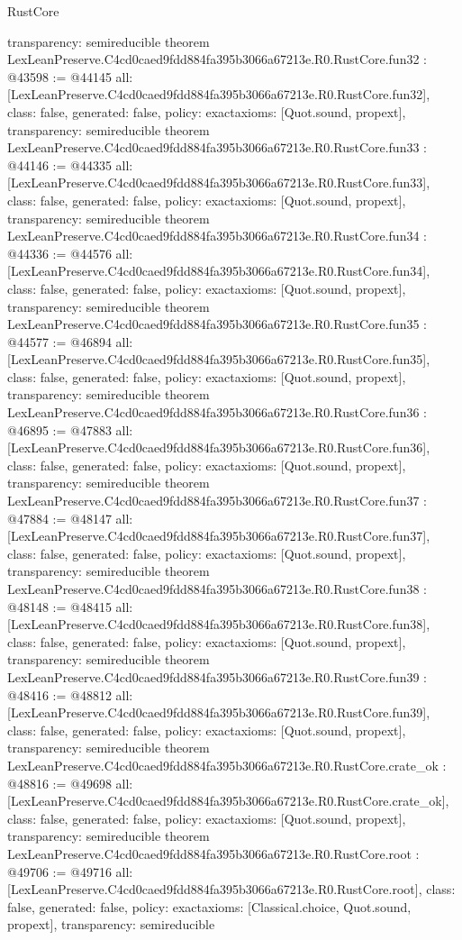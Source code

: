 \begin{lexlean}{RustCore}
\begin{coremodule}
{  transparency: semireducible
}
theorem LexLeanPreserve.C4cd0caed9fdd884fa395b3066a67213e.R0.RustCore.fun32 : @43598 := @44145 {
  all: [LexLeanPreserve.C4cd0caed9fdd884fa395b3066a67213e.R0.RustCore.fun32],
  class: false,
  generated: false,
  policy: exact{axioms: [Quot.sound, propext]},
  transparency: semireducible
}
theorem LexLeanPreserve.C4cd0caed9fdd884fa395b3066a67213e.R0.RustCore.fun33 : @44146 := @44335 {
  all: [LexLeanPreserve.C4cd0caed9fdd884fa395b3066a67213e.R0.RustCore.fun33],
  class: false,
  generated: false,
  policy: exact{axioms: [Quot.sound, propext]},
  transparency: semireducible
}
theorem LexLeanPreserve.C4cd0caed9fdd884fa395b3066a67213e.R0.RustCore.fun34 : @44336 := @44576 {
  all: [LexLeanPreserve.C4cd0caed9fdd884fa395b3066a67213e.R0.RustCore.fun34],
  class: false,
  generated: false,
  policy: exact{axioms: [Quot.sound, propext]},
  transparency: semireducible
}
theorem LexLeanPreserve.C4cd0caed9fdd884fa395b3066a67213e.R0.RustCore.fun35 : @44577 := @46894 {
  all: [LexLeanPreserve.C4cd0caed9fdd884fa395b3066a67213e.R0.RustCore.fun35],
  class: false,
  generated: false,
  policy: exact{axioms: [Quot.sound, propext]},
  transparency: semireducible
}
theorem LexLeanPreserve.C4cd0caed9fdd884fa395b3066a67213e.R0.RustCore.fun36 : @46895 := @47883 {
  all: [LexLeanPreserve.C4cd0caed9fdd884fa395b3066a67213e.R0.RustCore.fun36],
  class: false,
  generated: false,
  policy: exact{axioms: [Quot.sound, propext]},
  transparency: semireducible
}
theorem LexLeanPreserve.C4cd0caed9fdd884fa395b3066a67213e.R0.RustCore.fun37 : @47884 := @48147 {
  all: [LexLeanPreserve.C4cd0caed9fdd884fa395b3066a67213e.R0.RustCore.fun37],
  class: false,
  generated: false,
  policy: exact{axioms: [Quot.sound, propext]},
  transparency: semireducible
}
theorem LexLeanPreserve.C4cd0caed9fdd884fa395b3066a67213e.R0.RustCore.fun38 : @48148 := @48415 {
  all: [LexLeanPreserve.C4cd0caed9fdd884fa395b3066a67213e.R0.RustCore.fun38],
  class: false,
  generated: false,
  policy: exact{axioms: [Quot.sound, propext]},
  transparency: semireducible
}
theorem LexLeanPreserve.C4cd0caed9fdd884fa395b3066a67213e.R0.RustCore.fun39 : @48416 := @48812 {
  all: [LexLeanPreserve.C4cd0caed9fdd884fa395b3066a67213e.R0.RustCore.fun39],
  class: false,
  generated: false,
  policy: exact{axioms: [Quot.sound, propext]},
  transparency: semireducible
}
theorem LexLeanPreserve.C4cd0caed9fdd884fa395b3066a67213e.R0.RustCore.crate_ok : @48816 := @49698 {
  all: [LexLeanPreserve.C4cd0caed9fdd884fa395b3066a67213e.R0.RustCore.crate_ok],
  class: false,
  generated: false,
  policy: exact{axioms: [Quot.sound, propext]},
  transparency: semireducible
}
theorem LexLeanPreserve.C4cd0caed9fdd884fa395b3066a67213e.R0.RustCore.root : @49706 := @49716 {
  all: [LexLeanPreserve.C4cd0caed9fdd884fa395b3066a67213e.R0.RustCore.root],
  class: false,
  generated: false,
  policy: exact{axioms: [Classical.choice, Quot.sound, propext]},
  transparency: semireducible
}


\end{coremodule}
\end{lexlean}
